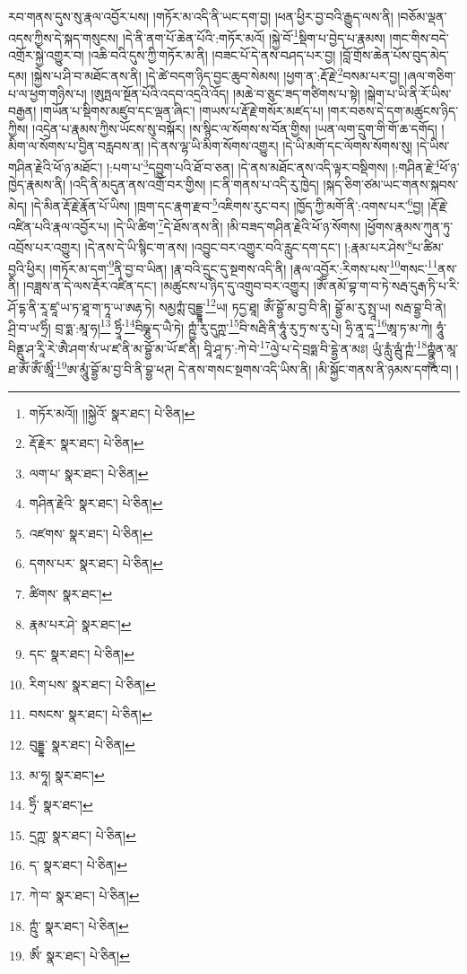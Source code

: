 རབ་གནས་དུས་སུ་རྣལ་འབྱོར་པས། །གཏོར་མ་འདི་ནི་ཡང་དག་བྱ། །ཕན་ཕྱིར་བྱ་བའི་རྒྱུད་ལས་ནི། །བཅོམ་ལྡན་འདས་ཀྱིས་དེ་སྐད་གསུངས། །དེ་ནི་ནག་པོ་ཆེན་པོའི་:གཏོར་མའོ། །སྐྱེ་བོ་\footnote{གཏོར་མའོ།། །།སྐྱེའོ་  སྣར་ཐང་།  པེ་ཅིན། }སྡིག་པ་བྱེད་པ་རྣམས། །གང་གིས་བདེ་འགྲོར་སྐྱེ་འགྱུར་བ། །འཆི་བའི་དུས་ཀྱི་གཏོར་མ་ནི། །བཟང་པོ་དེ་ནས་བཤད་པར་བྱ། །བློ་གྲོས་ཆེན་པོས་བུད་མེད་དམ། །སྐྱེས་པ་ཤི་བ་མཐོང་ནས་ནི། །དེ་ཚེ་བདག་ཉིད་བྱང་ཆུབ་སེམས། །ཕྱག་ན་:རྡོ་རྗེ་\footnote{རྡོ་རྗེར་  སྣར་ཐང་།  པེ་ཅིན། }བསམ་པར་བྱ། །ཞལ་གཅིག་པ་ལ་ཕྱག་གཉིས་པ། །ཨུཏྤལ་སྔོན་པོའི་འདབ་འདྲའི་འོད། །མཆེ་བ་ཅུང་ཟད་གཙིགས་པ་སྟེ། །སྒེག་པ་ཡི་ནི་རོ་ཡིས་བརྒྱན། །གཡོན་པ་སྡིགས་མཛུབ་དང་ལྡན་ཞིང་། །གཡས་པ་རྡོ་རྗེ་གསོར་མཛད་པ། །གར་བཅས་དེ་དག་མཚུངས་ཉིད་ཀྱིས། །འདྲེན་པ་རྣམས་ཀྱིས་ཡོངས་སུ་བསྐོར། །ས་སྙིང་ལ་སོགས་ས་བོན་གྱིས། །ཡན་ལག་དྲུག་གི་གོ་ཆ་དགོད། །མིག་ལ་སོགས་པ་བྱིན་བརླབས་ན། །དེ་ནས་ལྷ་ཡི་མིག་སོགས་འགྱུར། །དེ་ཡི་མགོ་དང་ལོགས་སོགས་སུ། །དེ་ཡིས་གཤིན་རྗེའི་ཕོ་ཉ་མཐོང་། །:པག་པ་\footnote{ལག་པ་  སྣར་ཐང་།  པེ་ཅིན། }དབྱུག་པའི་ཐོ་བ་ཅན། །དེ་ནས་མཐོང་ནས་འདི་ལྟར་བསྡིགས། །:གཤིན་རྗེ་\footnote{གཤིན་རྗེའི་  སྣར་ཐང་།  པེ་ཅིན། }ཕོ་ཉ་ཁྱེད་རྣམས་ནི། །འདི་ནི་མདུན་ནས་འགྲོ་བར་གྱིས། །ང་ནི་གནས་པ་འདི་རུ་ཁྱེད། །སྐད་ཅིག་ཙམ་ཡང་གནས་སྐབས་མེད། །དེ་མིན་རྡོ་རྗེ་རྣོན་པོ་ཡིས། །ཁྲག་དང་རྣག་རྫབ་\footnote{འཛགས་  སྣར་ཐང་།  པེ་ཅིན། }འཇིགས་རུང་བར། །ཁྱོད་ཀྱི་མགོ་ནི་:འགས་པར་\footnote{དགས་པར་  སྣར་ཐང་།  པེ་ཅིན། }བྱ། །རྡོ་རྗེ་འཛིན་པའི་རྣལ་འབྱོར་པ། །དེ་ཡི་ཚིག་\footnote{ཚིགས་  སྣར་ཐང་། }དེ་ཐོས་ནས་ནི། །མི་བཟད་གཤིན་རྗེའི་ཕོ་ཉ་སོགས། །ཕྱོགས་རྣམས་ཀུན་ཏུ་འབྲོས་པར་འགྱུར། །དེ་ནས་དེ་ཡི་སྙིང་ག་ནས། །འབྱུང་བར་འགྱུར་བའི་རླུང་དག་དང་། །:རྣམ་པར་ཤེས་\footnote{རྣམ་པར་ཤེ་  སྣར་ཐང་། }པ་ཚིམ་བྱའི་ཕྱིར། །གཏོར་མ་དག་\footnote{དང་  སྣར་ཐང་།  པེ་ཅིན། }ནི་བྱ་བ་ཡིན། །རྣ་བའི་དྲུང་དུ་སྔགས་འདི་ནི། །རྣལ་འབྱོར་:རིགས་པས་\footnote{རིག་པས་  སྣར་ཐང་།  པེ་ཅིན། }གསང་\footnote{བསངས་  སྣར་ཐང་།  པེ་ཅིན། }ནས་ནི། །བཟླས་ན་དེ་ལས་རྡོར་འཛིན་དང་། །མཚུངས་པ་ཉིད་དུ་འགྲུབ་བར་འགྱུར། །ཨོཾ་ནམོ་བྷ་ག་བ་ཏེ་སརྦ་དུརྒ་ཏི་པ་རི་ཤོ་དྷ་ནི་རཱ་ཛཱ་ཡ་ཏ་ཐཱ་ག་ཏཱ་ཡ་ཨརྷ་ཏེ། སམྱཀྶཾ་བུདྡྷཱ་\footnote{བུདྡྷ་  སྣར་ཐང་།  པེ་ཅིན། }ཡ། ཏདྱ་ཐཱ། ཨོཾ་བྷྱོ་མ་བྱ་བི་ནི། བྷྱོ་མ་རུ་སྤཱ་ཡ། སརྦ་བྷྱ་བི་ནེ། ཤྲི་བ་ཡ་ཧྲིཾ། བྲ་ཧྨ་:མཱ་ཧ།\footnote{མ་ཧཱ།  སྣར་ཐང་། } ཧྲཱིཾ་\footnote{ཧྲིཾ་  སྣར་ཐང་། }བིཥྞུ་ད་ཡཻ་ཏེ། ཀྵྱཾ་རུ་དུཀྵ་\footnote{དྲཀྵ་  སྣར་ཐང་།  པེ་ཅིན། }བི་སརྦི་ནི་ཧཱུཾ་རུ་ཏྲ་ས་རུ་པེ། ཧྲི་ནཱ་དཱ་\footnote{ད་  སྣར་ཐང་།  པེ་ཅིན། }ཨཱ་ཏ་མ་ཀེ། ཧཱུཾ་བིནྡུ་ཤ་རཱི་རེ་ཨཻ་ཤག་སཾ་ཡ་ཛ་ནི་མ་བྷྱོ་མ་ཡོ་ཛ་ནི། བཱི་ཤཱ་ཏ་:ཀེ་བེ་\footnote{ཀེ་བ་  སྣར་ཐང་།  པེ་ཅིན། }ལྱེ་པ་དེ་བྲཧྨ་བི་དྷྱེ་ན་མཿ། ཡུཾ་རླུཾ་ལྦུཾ་ཀྵཾ་\footnote{ཀྵུཾ་  སྣར་ཐང་།  པེ་ཅིན། }ཀྵྣྱུཾན་མཱ་ཐ་ཨོཾ་ཨོཾ་ཨཱིཾ་\footnote{ཨིཾ་  སྣར་ཐང་།  པེ་ཅིན། }ཨ་མཱུཾ་བྷྱོ་མ་བྱ་བི་ནི་བྷྱ་ཕཊ། དེ་ནས་གསང་སྔགས་འདི་ཡིས་ནི། །མི་སྐྱོང་གནས་ནི་ཉམས་དགའ་བ། །

